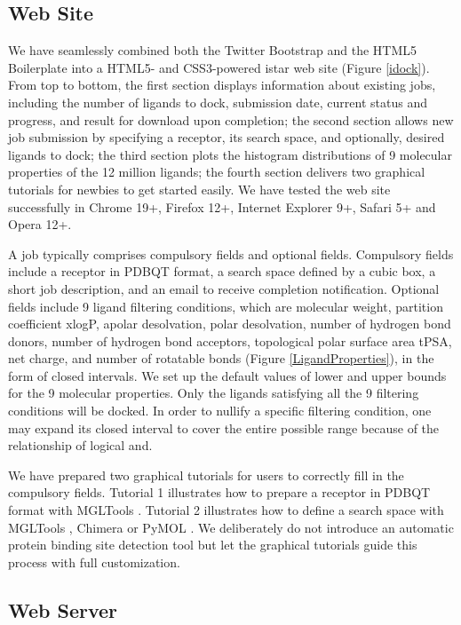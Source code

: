 \documentclass[12pt]{article}
\begin{document}
\subsection*{\sffamily \large Web Site}

We have seamlessly combined both the Twitter Bootstrap and the HTML5 Boilerplate into a HTML5- and CSS3-powered istar web site (Figure \ref{idock}). From top to bottom, the first section displays information about existing jobs, including the number of ligands to dock, submission date, current status and progress, and result for download upon completion; the second section allows new job submission by specifying a receptor, its search space, and optionally, desired ligands to dock; the third section plots the histogram distributions of 9 molecular properties of the 12 million ligands; the fourth section delivers two graphical tutorials for newbies to get started easily. We have tested the web site successfully in Chrome 19+, Firefox 12+, Internet Explorer 9+, Safari 5+ and Opera 12+.

A job typically comprises compulsory fields and optional fields. Compulsory fields include a receptor in PDBQT format, a search space defined by a cubic box, a short job description, and an email to receive completion notification. Optional fields include 9 ligand filtering conditions, which are molecular weight, partition coefficient xlogP, apolar desolvation, polar desolvation, number of hydrogen bond donors, number of hydrogen bond acceptors, topological polar surface area tPSA, net charge, and number of rotatable bonds (Figure \ref{LigandProperties}), in the form of closed intervals. We set up the default values of lower and upper bounds for the 9 molecular properties. Only the ligands satisfying all the 9 filtering conditions will be docked. In order to nullify a specific filtering condition, one may expand its closed interval to cover the entire possible range because of the relationship of logical and.

We have prepared two graphical tutorials for users to correctly fill in the compulsory fields. Tutorial 1 illustrates how to prepare a receptor in PDBQT format with MGLTools \citep{596}. Tutorial 2 illustrates how to define a search space with MGLTools \citep{596}, Chimera \citep{1219} or PyMOL \citep{1221}. We deliberately do not introduce an automatic protein binding site detection tool but let the graphical tutorials guide this process with full customization.

\subsection*{\sffamily \large Web Server}
\end{document}
